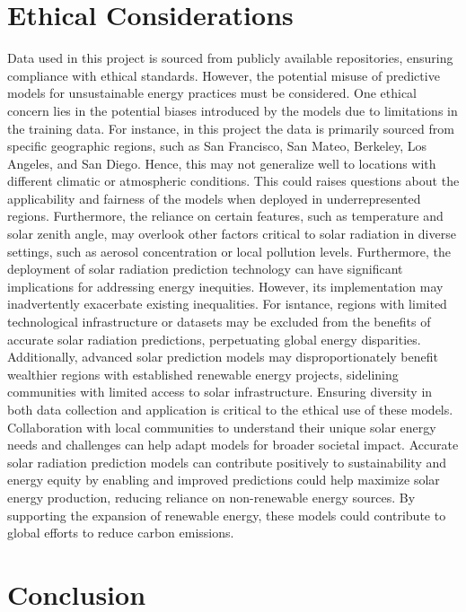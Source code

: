 \documentclass[10pt,twocolumn]{article}
\begin{document}
\section{Ethical Considerations}

Data used in this project is sourced from publicly available repositories, ensuring compliance with ethical standards. However, the potential misuse of predictive models for unsustainable energy practices must be considered. One ethical concern lies in the potential biases introduced by the models due to limitations in the training data. For instance, in this project the data is primarily sourced from specific geographic regions, such as San Francisco, San Mateo, Berkeley, Los Angeles, and San Diego. Hence, this may not generalize well to locations with different climatic or atmospheric conditions. This could raises questions about the applicability and fairness of the models when deployed in underrepresented regions. Furthermore, the reliance on certain features, such as temperature and solar zenith angle, may overlook other factors critical to solar radiation in diverse settings, such as aerosol concentration or local pollution levels. Furthermore, the deployment of solar radiation prediction technology can have significant implications for addressing energy inequities. However, its implementation may inadvertently exacerbate existing inequalities. For isntance, regions with limited technological infrastructure or datasets may be excluded from the benefits of accurate solar radiation predictions, perpetuating global energy disparities. Additionally, advanced solar prediction models may disproportionately benefit wealthier regions with established renewable energy projects, sidelining communities with limited access to solar infrastructure. Ensuring diversity in both data collection and application is critical to the ethical use of these models. Collaboration with local communities to understand their unique solar energy needs and challenges can help adapt models for broader societal impact. Accurate solar radiation prediction models can contribute positively to sustainability and energy equity by enabling and improved predictions could help maximize solar energy production, reducing reliance on non-renewable energy sources. By supporting the expansion of renewable energy, these models could contribute to global efforts to reduce carbon emissions.
\section{Conclusion}
\end{document}
